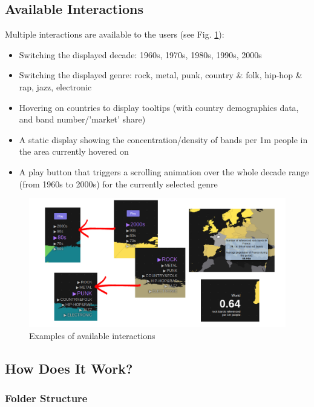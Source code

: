 \documentclass[twocolumn, letterpaper,13pt]{scrartcl}
\begin{document}
    \subsection{Available Interactions}
    
    Multiple interactions are available to the users (see Fig. \ref{fig:c}):
    \begin{itemize}
        \item Switching the displayed decade: 1960s, 1970s, 1980s, 1990s, 2000s
        \item Switching the displayed genre: rock, metal, punk, country \& folk, hip-hop \& rap, jazz, electronic
        \item Hovering on countries to display tooltips (with country demographics data, and band number/'market' share)
        \item A static display showing the concentration/density of bands per 1m people in the area currently hovered on
        \item A play button that triggers a scrolling animation over the whole decade range (from 1960s to 2000s) for the currently selected genre
    \end{itemize}

    \begin{figure}	\includegraphics[width=0.98\linewidth]{interactions.png}
    \caption{Examples of available interactions\label{fig:c}}
    \end{figure}

    \subsection{How Does It Work?}
    
    \subsubsection*{Folder Structure}
    
\end{document}
